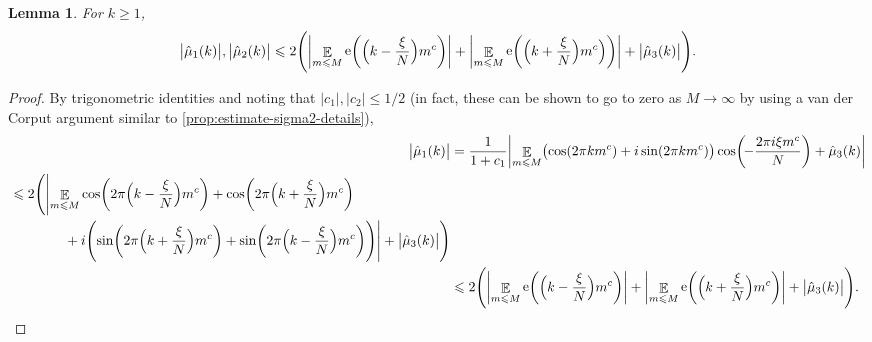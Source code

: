 \documentclass[letterpaper, 12pt]{article}
\theoremstyle{plain}
\newtheorem{Lemma}[Theorem]{Lemma}
\theoremstyle{definition}
\theoremstyle{plain}
\theoremstyle{plain}
\numberwithin{equation}{section}
\renewcommand{\leq}{\leqslant}
\renewcommand{\geq}{\geqslant}
\newcommand{\E}{\mathbb{E}}
\newcommand{\1}{\textbf{1}}
\DeclareMathOperator{\e}{e}
\begin{document}
\begin{Lemma}\label{lem:ft-bounds-for-measures}
    For $k \geq 1$,
    \begin{equation*}
        \bigl\lvert \hat{\mu}_1(k) \bigr\rvert, \bigl\lvert \hat{\mu}_2(k) \bigr\rvert 
        \leq 2\Biggl(\biggl\lvert \mathop{\E}_{m \leq M} \e\biggl(\Bigl(k - \frac{\xi}{N} \Bigr) m^c \biggr) \biggr\rvert 
        + \biggl\lvert \mathop{\E}_{m \leq M} \e\biggl(\Bigl(k + \frac{\xi}{N} \Bigr)m^c \Bigr) \biggr)\biggr\rvert + \bigl\lvert \hat{\mu}_3(k) \bigr\rvert \Biggr).
    \end{equation*}
\end{Lemma}
\begin{proof}
By trigonometric identities and noting that $\lvert c_1 \rvert, \lvert c_2 \rvert \leq 1/2$ (in fact, these can be shown to go to zero as $M \to \infty$ by using a van der Corput argument similar to \cref{prop:estimate-sigma2-details}),
\begin{align*}
    \bigl\lvert \hat{\mu}_1(k) \bigr\rvert &= \frac{1}{1 + c_1} \biggl\lvert\mathop{\E}_{m \leq M} \bigl(\cos(2\pi km^c) + i \sin(2\pi k m^c)\bigr) \cos\biggl(\!-\frac{2\pi i \xi m^c}{N}\biggr) + \hat{\mu}_3(k) \biggr\rvert \\
    \begin{split}
        &\leq 2\Biggl(\Biggl\lvert \mathop{\E}_{m \leq M} \cos\biggl(2\pi \Bigl(k - \frac{\xi}{N} \Bigr) m^c \biggr)
        + \cos\biggl(2\pi \Bigl(k + \frac{\xi}{N}\Bigr) m^c \biggr)\\
        &\qquad\qquad + i\Biggl(\sin\biggl(2\pi \Bigl(k + \frac{\xi}{N}\Bigr) m^c \biggr) 
        + \sin\biggl(2\pi \Bigl(k - \frac{\xi}{N}\Bigr) m^c \biggr)\Biggr) \Biggr\rvert 
        + \bigl\lvert \hat{\mu}_3(k) \bigr\rvert \Biggr)
    \end{split}\\
    &\leq 2\Biggl(\biggl\lvert \mathop{\E}_{m \leq M} \e\biggl(\Bigl(k - \frac{\xi}{N}\Bigr) m^c \biggr)\biggr\rvert 
    + \biggl\lvert \mathop{\E}_{m \leq M} \e\biggl(\Bigl(k + \frac{\xi}{N}\Bigr) m^c \biggr)\biggr\rvert 
    + \bigl\lvert \hat{\mu}_3(k) \bigr\rvert \Biggr).
\end{align*}


\end{proof}
\end{document}
